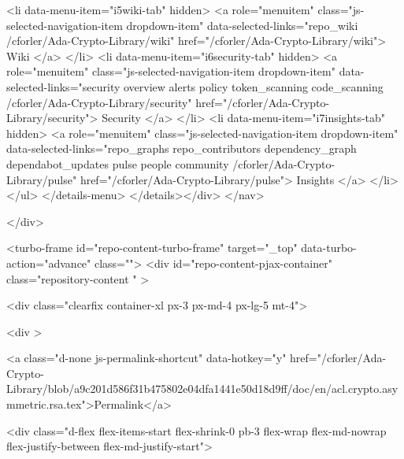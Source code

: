               <li data-menu-item="i5wiki-tab" hidden>
                <a role="menuitem" class="js-selected-navigation-item dropdown-item" data-selected-links="repo_wiki /cforler/Ada-Crypto-Library/wiki" href="/cforler/Ada-Crypto-Library/wiki">
                  Wiki
</a>              </li>
              <li data-menu-item="i6security-tab" hidden>
                <a role="menuitem" class="js-selected-navigation-item dropdown-item" data-selected-links="security overview alerts policy token_scanning code_scanning /cforler/Ada-Crypto-Library/security" href="/cforler/Ada-Crypto-Library/security">
                  Security
</a>              </li>
              <li data-menu-item="i7insights-tab" hidden>
                <a role="menuitem" class="js-selected-navigation-item dropdown-item" data-selected-links="repo_graphs repo_contributors dependency_graph dependabot_updates pulse people community /cforler/Ada-Crypto-Library/pulse" href="/cforler/Ada-Crypto-Library/pulse">
                  Insights
</a>              </li>
          </ul>
</details-menu>
</details></div>
</nav>

  </div>

  



<turbo-frame id="repo-content-turbo-frame" target="_top" data-turbo-action="advance" class="">
    <div id="repo-content-pjax-container" class="repository-content " >
    


    
      
  <div class="clearfix container-xl px-3 px-md-4 px-lg-5 mt-4">
    
    
<div >
  

  



    
<a class="d-none js-permalink-shortcut" data-hotkey="y" href="/cforler/Ada-Crypto-Library/blob/a9c201d586f31b475802e04dfa1441e50d18d9ff/doc/en/acl.crypto.asymmetric.rsa.tex">Permalink</a>

<div class="d-flex flex-items-start flex-shrink-0 pb-3 flex-wrap flex-md-nowrap flex-justify-between flex-md-justify-start">
  
